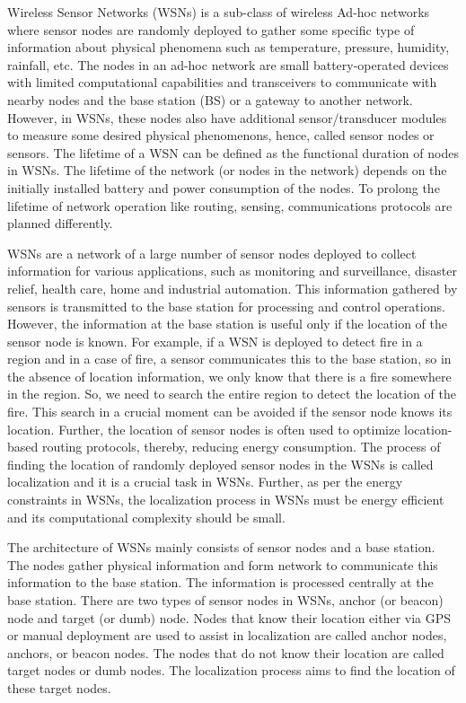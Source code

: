 Wireless Sensor Networks (WSNs) is a sub-class of wireless Ad-hoc networks where sensor nodes are randomly deployed to gather some specific type of information about physical phenomena such as temperature, pressure, humidity, rainfall, etc. The nodes in an ad-hoc network are small battery-operated devices with limited computational capabilities and transceivers to communicate with nearby nodes and the base station (BS) or a gateway to another network. However, in WSNs, these nodes also have additional sensor/transducer modules to measure some desired physical phenomenons, hence, called sensor nodes or sensors. The lifetime of a WSN can be defined as the functional duration of nodes in WSNs. The lifetime of the network (or nodes in the network) depends on the initially installed battery and power consumption of the nodes. To prolong the lifetime of network operation like routing, sensing, communications protocols are planned differently.
\par
WSNs are a network of a large number of sensor nodes deployed to collect information for various applications, such as monitoring and surveillance, disaster relief, health care, home and industrial automation. This information gathered by sensors is transmitted to the base station for processing and control operations. However, the information at the base station is useful only if the location of the sensor node is known. For example, if a WSN is deployed to detect fire in a region and in a case of fire, a sensor communicates this to the base station, so in the absence of location information, we only know that there is a fire somewhere in the region. So, we need to search the entire region to detect the location of the fire. This search in a crucial moment can be avoided if the sensor node knows its location. Further, the location of sensor nodes is often used to optimize location-based routing protocols, thereby, reducing energy consumption. The process of finding the location of randomly deployed sensor nodes in the WSNs is called localization and it is a crucial task in WSNs. Further, as per the energy constraints in WSNs, the localization process in WSNs must be energy efficient and its computational complexity should be small.
\par
The architecture of WSNs mainly consists of sensor nodes and a base station. The nodes gather physical information and form network to communicate this information to the base station. The information is processed centrally at the base station. There are two types of sensor nodes in WSNs, anchor (or beacon) node and target (or dumb) node. Nodes that know their location either via GPS or manual deployment are used to assist in localization are called anchor nodes, anchors, or beacon nodes. The nodes that do not know their location are called target nodes or dumb nodes. The localization process aims to find the location of these target nodes.
